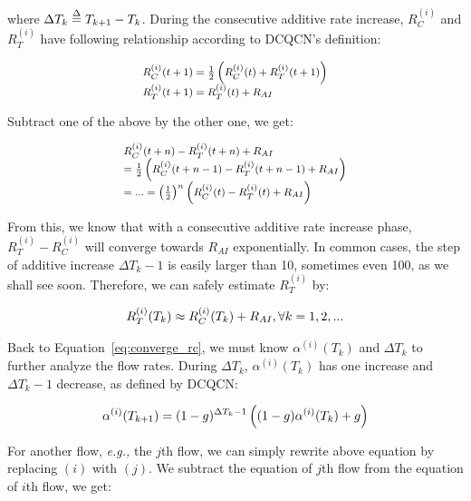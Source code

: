 where $\Delta {T_k} \buildrel \Delta \over = {T_{k + 1}} - {T_k}$. During the consecutive 
additive rate increase, $R_C^{(i)}$ and $R_T^{(i)}$ have following relationship according 
to DCQCN's definition:

\begin{equation}
\small
\begin{array}{l}
R_C^{(i)}(t + 1) = \frac{1}{2}\left( {R_C^{(i)}(t) + R_T^{(i)}(t + 1)} \right)\\
R_T^{(i)}(t + 1) = R_T^{(i)}(t) + {R_{AI}}
\end{array}
\end{equation}

Subtract one of the above by the other one, we get:

\begin{equation}
\small
\begin{array}{l}
R_C^{(i)}(t + n) - R_T^{(i)}(t + n) + {R_{AI}}\\
 = \frac{1}{2}\left( {R_C^{(i)}(t + n - 1) - R_T^{(i)}(t + n - 1) + {R_{AI}}} \right)\\
 = ... = {\left( {\frac{1}{2}} \right)^n}\left( {R_C^{(i)}(t) - R_T^{(i)}(t) + {R_{AI}}} \right)
\end{array}
\end{equation}

From this, we know that with a consecutive additive rate increase phase, $R_T^{(i)} - R_C^{(i)}$
will converge towards $R_{AI}$ exponentially. In common cases, the step of additive increase
$\Delta {T_k} - 1$ is easily larger than 10, sometimes even 100, as we shall see soon. Therefore,
we can safely estimate $R_T^{(i)}$ by:

\begin{equation}
\small
R_T^{(i)}({T_k}) \approx R_C^{(i)}({T_k}) + {R_{AI}},\forall k = 1,2,...
\end{equation}

Back to Equation~\ref{eq:converge_rc}, we must know $\alpha ^{(i)}({T_k})$ and $\Delta T_k$ to 
further analyze the flow rates. During $\Delta T_k$, $\alpha ^{(i)}({T_k})$ has one increase
and $\Delta T_k - 1$ decrease, as defined by DCQCN:

\begin{equation}
\small
{\alpha ^{(i)}}({T_{k + 1}}) = {(1 - g)^{\Delta {T_k} - 1}}\left( {(1 - g){\alpha ^{(i)}}({T_k}) + g} \right)
\label{eq:converge_alpha}
\end{equation}

For another flow, {\em e.g.,} the $j$th flow, we can simply rewrite above equation by replacing 
$(i)$ with $(j)$. We subtract the equation of $j$th flow from the equation of $i$th flow, we get:

